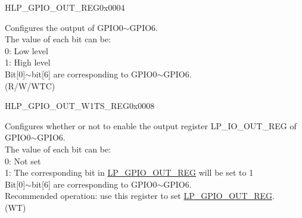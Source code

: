 \begin{register}{H}{LP\_GPIO\_OUT\_REG}{0x0004}\label{regdesc:LPGPIOOUTREG}
%
%
\regnewline%
\begin{regdesc}\begin{reglist}
\label{fielddesc:LPGPIOOUTDATAORIG}\item [LP\_GPIO\_OUT\_DATA\_ORIG] Configures the output of GPIO0$\sim$GPIO6.\\
The value of each bit can be:\\
0: Low level\\
1: High level\\
Bit[0]$\sim$bit[6] are corresponding to GPIO0$\sim$GPIO6.\\ (R/W/WTC)
\end{reglist}\end{regdesc}
\end{register}


\begin{register}{H}{LP\_GPIO\_OUT\_W1TS\_REG}{0x0008}\label{regdesc:LPGPIOOUTW1TSREG}
%
%
\regnewline%
\begin{regdesc}\begin{reglist}
\label{fielddesc:LPGPIOOUTW1TS}\item [LP\_GPIO\_OUT\_W1TS] Configures whether or not to enable the output register LP\_IO\_OUT\_REG of GPIO0$\sim$GPIO6.\\
The value of each bit can be:\\
0: Not set\\
1: The corresponding bit in \hyperref[regdesc:LPGPIOOUTREG]{LP\_GPIO\_OUT\_REG} will be set to 1\\
Bit[0]$\sim$bit[6] are corresponding to GPIO0$\sim$GPIO6.\\
Recommended operation: use this register to set \hyperref[regdesc:LPGPIOOUTREG]{LP\_GPIO\_OUT\_REG}. \\
(WT)
\end{reglist}\end{regdesc}
\end{register}


